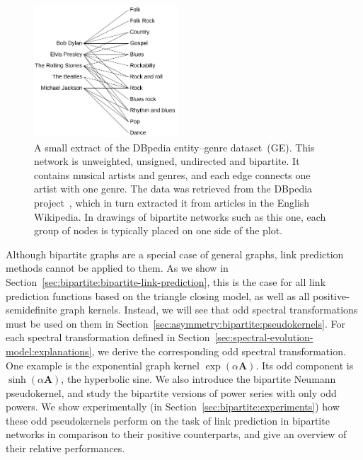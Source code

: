 \documentclass[11pt,a4paper]{book}
\newcommand{\wTwo}{0.48}
\begin{document}
\begin{figure}[h!]
  \centering
  \includegraphics[width=\wTwo\textwidth]{img-pdf/genres}
  \caption[A small extract of the DBpedia entity--genre dataset.]{
    A small extract of the DBpedia entity--genre dataset~(\textsf{GE}). 
    This network is unweighted, unsigned, undirected and bipartite.  It contains
    musical artists and genres, 
    and each edge connects one artist with one genre. 
    The data was retrieved from the DBpedia project~\cite{b642}, which in
    turn extracted it from articles in the English
    Wikipedia. 
    In drawings of
    bipartite networks such as this one, each group of nodes is
    typically placed on one side of the plot. 
  }
  \label{fig:work-genre}
\end{figure}

Although bipartite graphs are a special case of general graphs, link prediction methods
cannot be applied to them.  As we show in
Section~\ref{sec:bipartite:bipartite-link-prediction}, this is the case
for all link prediction functions based on the triangle closing model,
as well as all positive-semidefinite graph kernels.
Instead, we will see that odd spectral transformations 
must be used on them in Section~\ref{sec:asymmetry:bipartite:pseudokernels}.   
For each spectral transformation defined in
Section~\ref{sec:spectral-evolution-model:explanations}, we 
derive the corresponding odd spectral transformation.  One example 
is the exponential graph kernel $\exp(\alpha \mathbf A)$.  Its odd component is
$\sinh(\alpha \mathbf A)$, the hyperbolic sine.  We also introduce the bipartite
Neumann pseudokernel, and study the bipartite versions of
power series with only odd powers.  We show experimentally (in
Section~\ref{sec:bipartite:experiments}) how these odd pseudokernels
perform on the task of link prediction in bipartite networks in
comparison to their positive counterparts, and give an overview of their
relative performances.  
\end{document}
